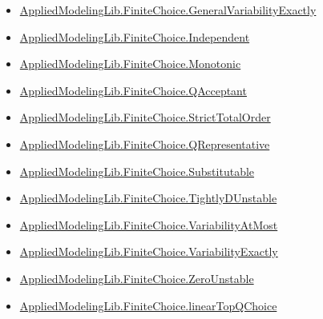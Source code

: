 \documentclass[10pt]{article}
\begin{document}
\begin{itemize}[leftmargin=1.2em]
\begin{itemize}[leftmargin=1.2em]
\item \hyperlink{library-prerequisite-019d4270644f6bc0}{Applied\allowbreak{}Modeling\allowbreak{}Lib.\allowbreak{}Finite\allowbreak{}Choice.\allowbreak{}General\allowbreak{}Variability\allowbreak{}Exactly}
\item \hyperlink{library-prerequisite-d829e32c981b16e0}{Applied\allowbreak{}Modeling\allowbreak{}Lib.\allowbreak{}Finite\allowbreak{}Choice.\allowbreak{}Independent}
\item \hyperlink{library-prerequisite-cffcb1bf819955c7}{Applied\allowbreak{}Modeling\allowbreak{}Lib.\allowbreak{}Finite\allowbreak{}Choice.\allowbreak{}Monotonic}
\item \hyperlink{library-prerequisite-162a2197f72e3870}{Applied\allowbreak{}Modeling\allowbreak{}Lib.\allowbreak{}Finite\allowbreak{}Choice.\allowbreak{}Q\allowbreak{}Acceptant}
\item \hyperlink{library-prerequisite-20b36bb360cd045f}{Applied\allowbreak{}Modeling\allowbreak{}Lib.\allowbreak{}Finite\allowbreak{}Choice.\allowbreak{}Strict\allowbreak{}Total\allowbreak{}Order}
\item \hyperlink{library-prerequisite-c73fa8cf2f53993d}{Applied\allowbreak{}Modeling\allowbreak{}Lib.\allowbreak{}Finite\allowbreak{}Choice.\allowbreak{}Q\allowbreak{}Representative}
\item \hyperlink{library-prerequisite-7e51ae62957957a3}{Applied\allowbreak{}Modeling\allowbreak{}Lib.\allowbreak{}Finite\allowbreak{}Choice.\allowbreak{}Substitutable}
\item \hyperlink{library-prerequisite-5330c440fe0a711d}{Applied\allowbreak{}Modeling\allowbreak{}Lib.\allowbreak{}Finite\allowbreak{}Choice.\allowbreak{}Tightly\allowbreak{}D\allowbreak{}Unstable}
\item \hyperlink{library-prerequisite-abc5950f6d631dc4}{Applied\allowbreak{}Modeling\allowbreak{}Lib.\allowbreak{}Finite\allowbreak{}Choice.\allowbreak{}Variability\allowbreak{}At\allowbreak{}Most}
\item \hyperlink{library-prerequisite-a78b284959779bc9}{Applied\allowbreak{}Modeling\allowbreak{}Lib.\allowbreak{}Finite\allowbreak{}Choice.\allowbreak{}Variability\allowbreak{}Exactly}
\item \hyperlink{library-prerequisite-c55a3088f91fbde6}{Applied\allowbreak{}Modeling\allowbreak{}Lib.\allowbreak{}Finite\allowbreak{}Choice.\allowbreak{}Zero\allowbreak{}Unstable}
\item \hyperlink{library-prerequisite-ad5a1ec386b1ba4b}{Applied\allowbreak{}Modeling\allowbreak{}Lib.\allowbreak{}Finite\allowbreak{}Choice.\allowbreak{}linear\allowbreak{}Top\allowbreak{}Q\allowbreak{}Choice}

\end{itemize}
\end{itemize}
\end{document}
